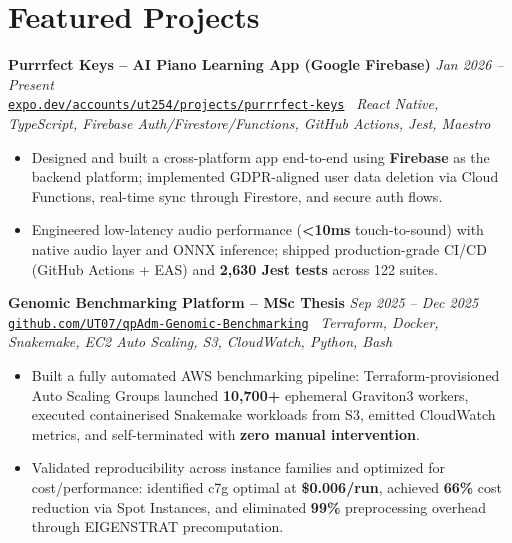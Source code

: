\documentclass[10pt,a4paper]{article}
\newcommand{\projectentryurl}[5]{%
  \Needspace{3\baselineskip}%
  \textbf{#1} \hfill \textit{#2}\\[-0.15em]
  {\small\href{#3}{\texttt{#4}}} \textbar\ \textit{#5}\\[-0.25em]
}
\begin{document}
\section*{Featured Projects}
\projectentryurl{Purrrfect Keys -- AI Piano Learning App (Google Firebase)}{Jan 2026 -- Present}{https://expo.dev/accounts/ut254/projects/purrrfect-keys/builds/229bd252-c684-4af5-b39f-4f3623455a7e}{expo.dev/accounts/ut254/projects/purrrfect-keys}{React Native, TypeScript, Firebase Auth/Firestore/Functions, GitHub Actions, Jest, Maestro}
\begin{itemize}
  \item Designed and built a cross-platform app end-to-end using \textbf{Firebase} as the backend platform; implemented GDPR-aligned user data deletion via Cloud Functions, real-time sync through Firestore, and secure auth flows.
  \item Engineered low-latency audio performance (\textbf{\textless10ms} touch-to-sound) with native audio layer and ONNX inference; shipped production-grade CI/CD (GitHub Actions + EAS) and \textbf{2,630 Jest tests} across 122 suites.
\end{itemize}

\vspace{0.10em}
\projectentryurl{Genomic Benchmarking Platform -- MSc Thesis}{Sep 2025 -- Dec 2025}{https://github.com/UT07/Performance-Optimization-and-Cost-Analysis-of-qpAdm-Genomic-Modeling}{github.com/UT07/qpAdm-Genomic-Benchmarking}{Terraform, Docker, Snakemake, EC2 Auto Scaling, S3, CloudWatch, Python, Bash}
\begin{itemize}
  \item Built a fully automated AWS benchmarking pipeline: Terraform-provisioned Auto Scaling Groups launched \textbf{10,700+} ephemeral Graviton3 workers, executed containerised Snakemake workloads from S3, emitted CloudWatch metrics, and self-terminated with \textbf{zero manual intervention}.
  \item Validated reproducibility across instance families and optimized for cost/performance: identified c7g optimal at \textbf{\$0.006/run}, achieved \textbf{66\%} cost reduction via Spot Instances, and eliminated \textbf{99\%} preprocessing overhead through EIGENSTRAT precomputation.
\end{itemize}
\end{document}
